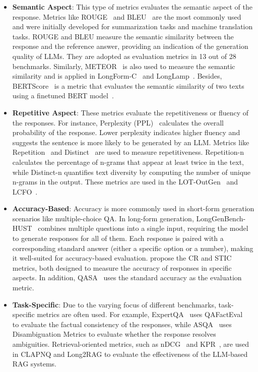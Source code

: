 \documentclass[11pt, a4paper, logo, copyright, nonumbering]{map}
\begin{document}
\begin{itemize}
    \item \textbf{Semantic Aspect}: This type of metrics evaluates the semantic aspect of the response. Metrics like ROUGE~\citep{lin2004rouge} and BLEU~\citep{papineni2002bleu} are the most commonly used and were initially developed for summarization tasks and machine translation tasks. ROUGE and BLEU measure the semantic similarity between the response and the reference answer, providing an indication of the generation quality of LLMs. They are adopted as evaluation metrics in 13 out of 28 benchmarks. Similarly, METEOR~\citep{banerjee2005meteor} is also used to measure the semantic similarity and is applied in LongForm-C~\citep{koksal2023longform} and LongLamp~\citep{kumar2024longlamp}. Besides, BERTScore~\citep{zhang2019bertscore} is a metric that evaluates the semantic similarity of two texts using a finetuned BERT model~\citep{jeong2024olaph}.
    \item \textbf{Repetitive Aspect}: These metrics evaluate the repetitiveness or fluency of the responses. For instance, Perplexity (PPL)~\citep{liang2023open} calculates the overall probability of the response. Lower perplexity indicates higher fluency and suggests the sentence is more likely to be generated by an LLM. Metrics like Repetition~\citep{shao2019long} and Distinct~\citep{li2015diversity} are used to measure repetitiveness. Repetition-n calculates the percentage of n-grams that appear at least twice in the text, while Distinct-n quantifies text diversity by computing the number of unique n-grams in the output. These metrics are used in the LOT-OutGen~\citep{guan2022lot} and LCFO~\citep{costa2024lcfo}.
    \item \textbf{Accuracy-Based}: Accuracy is more commonly used in short-form generation scenarios like multiple-choice QA. 
    In long-form generation, LongGenBench-HUST~\citep{liu2024longgenbench} combines multiple questions into a single input, requiring the model to generate responses for all of them. Each response is paired with a corresponding standard answer (either a specific option or a number), making it well-suited for accuracy-based evaluation.
    \citet{wu2024longgenbench} propose the CR and STIC metrics, both designed to measure the accuracy of responses in specific aspects.
    In addition, QASA~\citep{lee2023qasa} uses the standard accuracy as the evaluation metric.
    \item \textbf{Task-Specific}: Due to the varying focus of different benchmarks, task-specific metrics are often used. For example, ExpertQA~\citep{malaviya2023expertqa} uses QAFactEval~\citep{fabbri2021qafacteval} to evaluate the factual consistency of the responses, while ASQA~\citep{stelmakh2022asqa} uses Disambiguation Metrics to evaluate whether the response resolves ambiguities. Retrieval-oriented metrics, such as nDCG~\citep{rosenthal2024clapnq} and KPR~\citep{qi2024long2rag}, are used in CLAPNQ and Long2RAG to evaluate the effectiveness of the LLM-based RAG systems.
\end{itemize}
\end{document}
